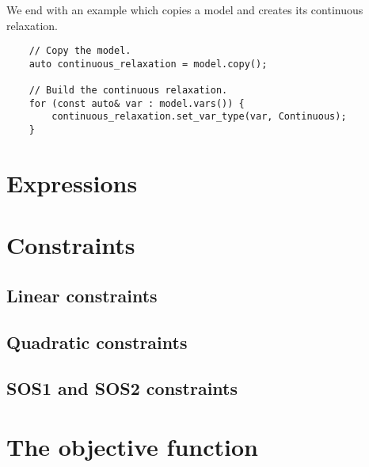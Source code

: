 We end with an example which copies a model and creates its continuous
relaxation.

\begin{lstlisting}
    // Copy the model.
    auto continuous_relaxation = model.copy();

    // Build the continuous relaxation. 
    for (const auto& var : model.vars()) {
        continuous_relaxation.set_var_type(var, Continuous);
    }
\end{lstlisting}

\section{Expressions}
\label{sec:expressions}

\section{Constraints}

\subsection{Linear constraints}

\subsection{Quadratic constraints}

\subsection{SOS1 and SOS2 constraints}

\section{The objective function}

